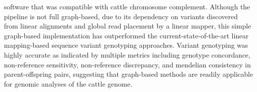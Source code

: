 \documentclass[../main.tex]{subfiles}
\begin{document}

software that was compatible with cattle chromosome complement. Although the pipeline is not full graph-based, due to its dependency on variants discovered from linear alignments and global read placement by a linear mapper, this simple graph-based implementation has outperformed the current-state-of-the-art linear mapping-based sequence variant genotyping approaches. Variant genotyping was highly accurate as indicated by multiple metrics including genotype concordance, non-reference sensitivity, non-reference discrepancy, and mendelian consistency in parent-offspring pairs, suggesting that graph-based methods are readily applicable for genomic analyses of the cattle genome.
\end{document}
